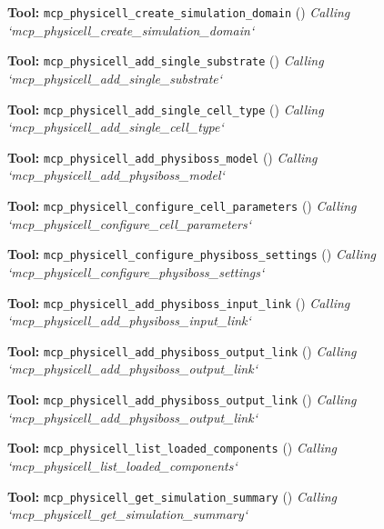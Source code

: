 \documentclass[11pt,a4paper]{article}
\begin{document}
\begin{toolokbox}
\textbf{Tool:} \texttt{mcp\_physicell\_create\_simulation\_domain} (\checkmark)
\textit{Calling `mcp\_physicell\_create\_simulation\_domain`}
\end{toolokbox}
\begin{toolokbox}
\textbf{Tool:} \texttt{mcp\_physicell\_add\_single\_substrate} (\checkmark)
\textit{Calling `mcp\_physicell\_add\_single\_substrate`}
\end{toolokbox}
\begin{toolokbox}
\textbf{Tool:} \texttt{mcp\_physicell\_add\_single\_cell\_type} (\checkmark)
\textit{Calling `mcp\_physicell\_add\_single\_cell\_type`}
\end{toolokbox}
\begin{toolokbox}
\textbf{Tool:} \texttt{mcp\_physicell\_add\_physiboss\_model} (\checkmark)
\textit{Calling `mcp\_physicell\_add\_physiboss\_model`}
\end{toolokbox}
\begin{toolokbox}
\textbf{Tool:} \texttt{mcp\_physicell\_configure\_cell\_parameters} (\checkmark)
\textit{Calling `mcp\_physicell\_configure\_cell\_parameters`}
\end{toolokbox}
\begin{toolokbox}
\textbf{Tool:} \texttt{mcp\_physicell\_configure\_physiboss\_settings} (\checkmark)
\textit{Calling `mcp\_physicell\_configure\_physiboss\_settings`}
\end{toolokbox}
\begin{toolokbox}
\textbf{Tool:} \texttt{mcp\_physicell\_add\_physiboss\_input\_link} (\checkmark)
\textit{Calling `mcp\_physicell\_add\_physiboss\_input\_link`}
\end{toolokbox}
\begin{toolokbox}
\textbf{Tool:} \texttt{mcp\_physicell\_add\_physiboss\_output\_link} (\checkmark)
\textit{Calling `mcp\_physicell\_add\_physiboss\_output\_link`}
\end{toolokbox}
\begin{toolokbox}
\textbf{Tool:} \texttt{mcp\_physicell\_add\_physiboss\_output\_link} (\checkmark)
\textit{Calling `mcp\_physicell\_add\_physiboss\_output\_link`}
\end{toolokbox}
\begin{toolokbox}
\textbf{Tool:} \texttt{mcp\_physicell\_list\_loaded\_components} (\checkmark)
\textit{Calling `mcp\_physicell\_list\_loaded\_components`}
\end{toolokbox}
\begin{toolokbox}
\textbf{Tool:} \texttt{mcp\_physicell\_get\_simulation\_summary} (\checkmark)
\textit{Calling `mcp\_physicell\_get\_simulation\_summary`}
\end{toolokbox}
\end{document}
